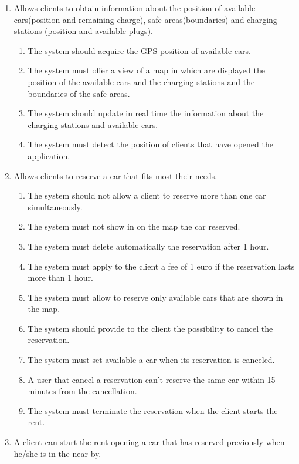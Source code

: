 \begin{enumerate}
\item Allows clients to obtain information about
the position of available cars(position and remaining charge), safe areas(boundaries) and charging stations (position and available plugs).
\begin{enumerate}
\item The system should acquire the GPS position of available cars.
\item The system must offer a view of a map in which are displayed the position of the available cars and the charging stations and the boundaries of the safe areas.
\item The system should update in real time the information about the charging stations and available cars.
\item The system must detect the position of clients that have opened the application.
\end{enumerate}


\item Allows clients to reserve a car that fits most their needs.
\begin{enumerate}
\item  The system should not allow a client to reserve more than one car simultaneously.
\item The system must not show in on the map the car reserved. 
\item The system must delete automatically the reservation after 1 hour.
\item The system must apply to the client a fee of 1 euro if the reservation lasts more than 1 hour.
\item The system must allow to reserve only available cars that are shown in the map.
\item The system should provide to the client the possibility to cancel the reservation.
\item The system must set available a car when its reservation is canceled.
\item A user that cancel a reservation can't reserve the same car within 15 minutes from the cancellation.
\item The system must terminate the reservation when the client starts the rent.
\end{enumerate}


\item A client can start the rent opening a car that has reserved previously when he/she is in the near by.


\end{enumerate}
